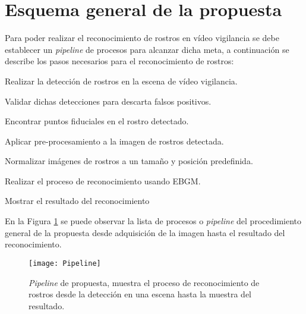 \section{Esquema general de la propuesta}
Para poder realizar el reconocimiento de rostros en vídeo vigilancia se debe establecer un \textit{pipeline} de procesos para alcanzar dicha meta, a continuación se describe los pasos necesarios para el reconocimiento de rostros:
\begin{enumerate}[label={[\arabic*]}]
\item Realizar la detección de rostros en la escena de vídeo vigilancia.
\item Validar dichas detecciones para descarta falsos positivos.
\item Encontrar puntos fiduciales en el rostro detectado.
\item Aplicar pre-procesamiento a la imagen de rostros detectada.
\item Normalizar imágenes de rostros a un tamaño y posición predefinida.
\item Realizar el proceso de reconocimiento usando \ac{EBGM}.
\item Mostrar el resultado del reconocimiento
\end{enumerate}
En la Figura \ref{im:PropPipeline} se puede observar la lista de procesos o \textit{pipeline} del procedimiento general de la propuesta desde adquisición de la imagen hasta el resultado del reconocimiento.
\begin{figure}[h]
\center
\texttt{[image: Pipeline]}
\caption{\textit{Pipeline} de propuesta, muestra el proceso de reconocimiento de rostros desde la detección en una escena hasta la muestra del resultado.}
\label{im:PropPipeline}
\end{figure}

